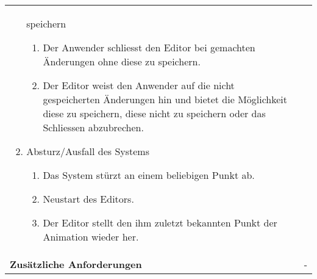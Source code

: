 \begin{table}[H]
\begin{tabular}{p{}p{}}
\begin{enumerate}[label= (\alph*)]
{                        speichern
                    \begin{enumerate}[label= (\roman*)]
                        \item{Der Anwender schliesst den Editor bei gemachten
                                Änderungen ohne diese zu speichern.}
                        \item{Der Editor weist den Anwender auf die
                                nicht gespeicherten Änderungen hin und bietet
                                die Möglichkeit diese zu speichern, diese nicht
                                zu speichern oder das Schliessen abzubrechen.}
                    \end{enumerate}
                }
                \item{Absturz/Ausfall des Systems
                    \begin{enumerate}[label= (\roman*)]
                            \item{Das System stürzt an einem beliebigen Punkt
                                    ab.}
                            \item{Neustart des Editors.}
                            \item{Der Editor stellt den ihm zuletzt bekannten
                                    Punkt der Animation wieder her.}
                    \end{enumerate}
                }
            \end{enumerate}
            \\
        \cmidrule(r){1-1}\cmidrule(lr){2-2}
            \textbf{Zusätzliche Anforderungen} &
            - \\
        \bottomrule
    \end{tabular}
\end{table}

